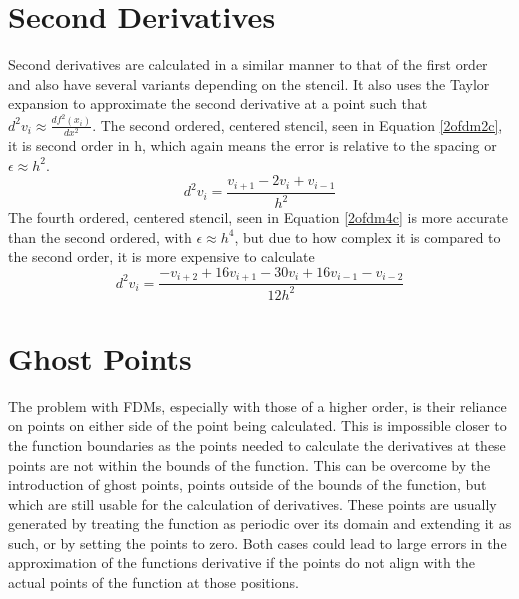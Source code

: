 \section{Second Derivatives}
Second derivatives are calculated in a similar manner to that of the first order and also have several variants depending on the stencil. It also uses the Taylor expansion to approximate the second derivative at a point such that $d^2v_i \approx \frac{df^2(x_i)}{dx^2}$.
\linebreak
\linebreak
The second ordered, centered stencil, seen in Equation \ref{2ofdm2c}, it is second order in h, which again means the error is relative to the spacing or $\epsilon \approx h^2$.
\begin{equation} \label{2ofdm2c}
  d^2v_i = \frac{v_{i+1} - 2v_i + v_{i-1}}{h^2}
\end{equation}
The fourth ordered, centered stencil, seen in Equation \ref{2ofdm4c} is more accurate than the second ordered, with $\epsilon \approx h^4$, but due to how complex it is compared to the second order, it is more expensive to calculate
\begin{equation} \label{2ofdm4c}
  d^2v_i = \frac{-v_{i+2} + 16v_{i+1} - 30v_i + 16v_{i-1} - v_{i-2}}{12h^2}
\end{equation}
\section{Ghost Points}
The problem with FDMs, especially with those of a higher order, is their reliance on points on either side of the point being calculated. This is impossible closer to the function boundaries as the points needed to calculate the derivatives at these points are not within the bounds of the function. This can be overcome by the introduction of ghost points, points outside of the bounds of the function, but which are still usable for the calculation of derivatives. These points are usually generated by treating the function as periodic over its domain and extending it as such, or by setting the points to zero. Both cases could lead to large errors in the approximation of the functions derivative if the points do not align with the actual points of the function at those positions.